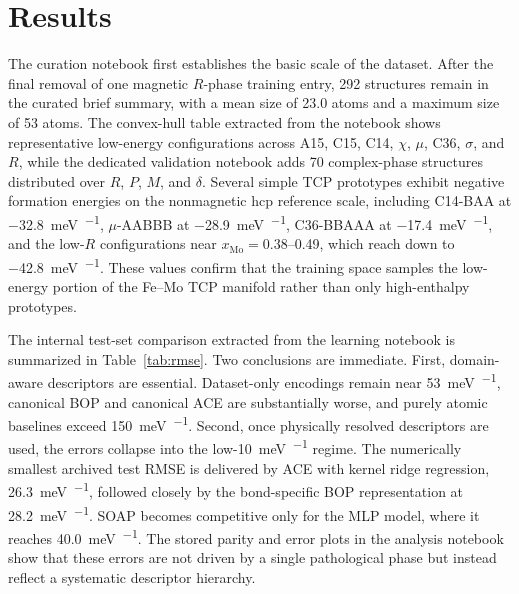 \section{Results}
\label{sec:results}

The curation notebook first establishes the basic scale of the dataset. After the final removal of one magnetic $R$-phase training entry, 292 structures remain in the curated brief summary, with a mean size of 23.0 atoms and a maximum size of 53 atoms. The convex-hull table extracted from the notebook shows representative low-energy configurations across A15, C15, C14, $\chi$, $\mu$, C36, $\sigma$, and $R$, while the dedicated validation notebook adds 70 complex-phase structures distributed over $R$, $P$, $M$, and $\delta$. Several simple TCP prototypes exhibit negative formation energies on the nonmagnetic hcp reference scale, including C14-BAA at \SI{-32.8}{\milli\electronvolt\per\atom}, $\mu$-AABBB at \SI{-28.9}{\milli\electronvolt\per\atom}, C36-BBAAA at \SI{-17.4}{\milli\electronvolt\per\atom}, and the low-$R$ configurations near $x_{\mathrm{Mo}}=0.38$--0.49, which reach down to \SI{-42.8}{\milli\electronvolt\per\atom}. These values confirm that the training space samples the low-energy portion of the Fe--Mo TCP manifold rather than only high-enthalpy prototypes.

The internal test-set comparison extracted from the learning notebook is summarized in Table~\ref{tab:rmse}. Two conclusions are immediate. First, domain-aware descriptors are essential. Dataset-only encodings remain near \SI{53}{\milli\electronvolt\per\atom}, canonical BOP and canonical ACE are substantially worse, and purely atomic baselines exceed \SI{150}{\milli\electronvolt\per\atom}. Second, once physically resolved descriptors are used, the errors collapse into the low-\SI{10}{\milli\electronvolt\per\atom} regime. The numerically smallest archived test RMSE is delivered by ACE with kernel ridge regression, \SI{26.3}{\milli\electronvolt\per\atom}, followed closely by the bond-specific BOP representation at \SI{28.2}{\milli\electronvolt\per\atom}. SOAP becomes competitive only for the MLP model, where it reaches \SI{40.0}{\milli\electronvolt\per\atom}. The stored parity and error plots in the analysis notebook show that these errors are not driven by a single pathological phase but instead reflect a systematic descriptor hierarchy.

